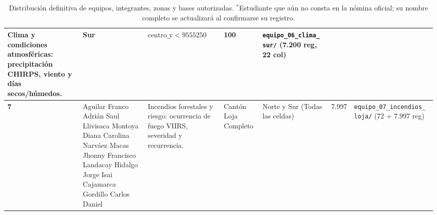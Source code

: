 \documentclass[11pt,a4paper]{article}
\begin{document}
\begin{table}[h!]
\begin{tabularx}{\textwidth}{C{0.8cm} L{3.5cm} L{3.3cm} C{1.1cm} C{1.8cm} C{1.1cm} Y}
Clima y condiciones atmosféricas: precipitación CHIRPS, viento y días secos/húmedos. & 
Sur & 
$\text{centro\_y} < 9555250$ & 
100 & 
\texttt{equipo\_06\_clima\_} \newline \texttt{sur/} \newline (7.200 reg, 22 col) \\
\midrule
\textbf{7} & 
\textbullet{} Aguilar Franco Adrián Saul\newline
\textbullet{} Llivisaca Montoya Diana Carolina\newline
\textbullet{} Narváez Macas Jhonny Francisco\newline
\textbullet{} Landacay Hidalgo Jorge Isai\newline
\textbullet{} Cajamarca Gordillo Carlos Daniel & 
Incendios forestales y riesgo: ocurrencia de fuego VIIRS, severidad y recurrencia. & 
Cantón Loja Completo & 
Norte y Sur (Todas las celdas) & 
7.997 & 
\texttt{equipo\_07\_incendios\_} \newline \texttt{loja/} \newline (72 + 7.997 reg) \\
\bottomrule
\end{tabularx}
\caption{Distribución definitiva de equipos, integrantes, zonas y bases autorizadas. $^{*}$Estudiante que aún no consta en la nómina oficial; su nombre completo se actualizará al confirmarse su registro.}
\label{tab:distribucion_equipos}
\end{table}
\end{document}
